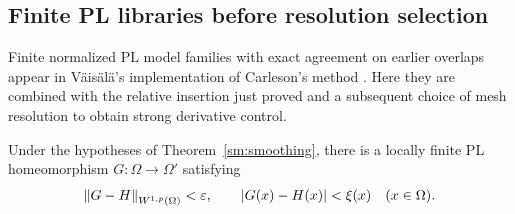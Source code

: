 \subsection{Finite PL libraries before resolution selection}

Finite normalized PL model families with exact agreement on earlier
overlaps appear in V\"ais\"al\"a's implementation of Carleson's method
\cite[Sections~1.2 and~2.7--2.11]{Vaisala1977}. Here they are combined
with the relative insertion just proved and a subsequent choice of mesh
resolution to obtain strong derivative control.

\begin{proposition}
\label{sm:bilip-pl}
Under the hypotheses of Theorem~\ref{sm:smoothing}, there is a
locally finite PL homeomorphism $G:\Omega\to\Omega'$ satisfying
\[
 \left\lVert G-H\right\rVert_{W^{1,p}(\Omega)}<\varepsilon,
 \qquad |G(x)-H(x)|<\xi(x)\quad(x\in\Omega).
\]
\end{proposition}

